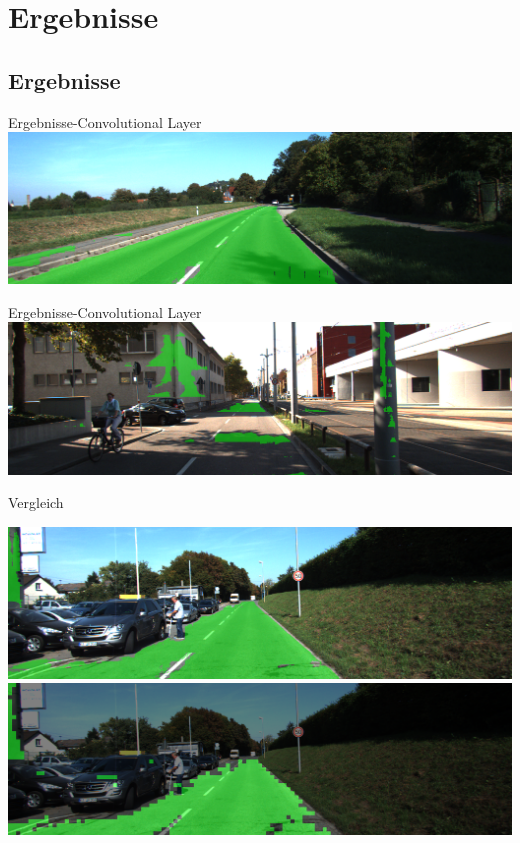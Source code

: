 \section{Ergebnisse}

\subsection{Ergebnisse}

\begin{frame}{Ergebnisse-Convolutional Layer}
    \includegraphics[scale=0.2]{../images/Convolutional/um_000014+-overlay-fully-49-patch.png}
\end{frame}

 \begin{frame}{Ergebnisse-Convolutional Layer}
    \includegraphics[scale=0.2]{../images/Convolutional/um_000066-overlay-fully-49-patch.png}
 \end{frame}

\begin{frame}{Vergleich}

      \includegraphics[scale=0.2]{../images/Convolutional/um_000014-overlay-fully-49-patch.png}
         \vspace{0.1cm}
    \includegraphics[scale=0.2]{../images/Convolutional/um_000014-overlay.png}

\end{frame}

